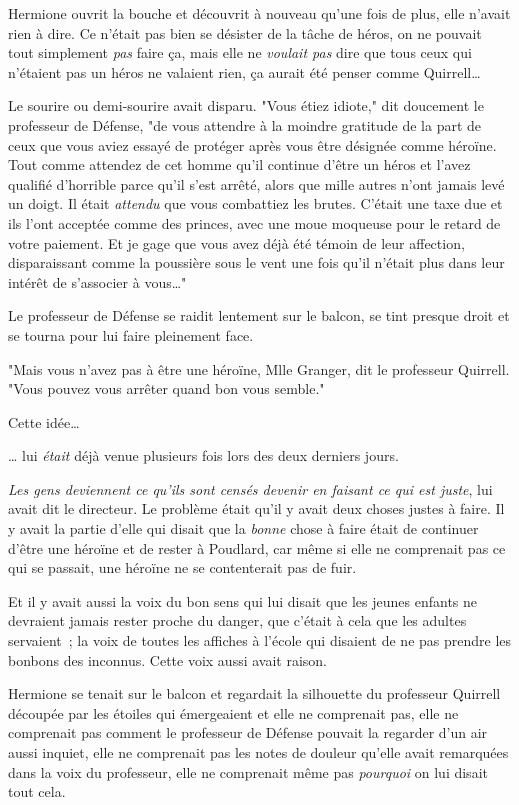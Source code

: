 Hermione ouvrit la bouche et découvrit à nouveau qu'une fois de plus, elle n'avait rien à dire. Ce n'était pas bien se désister de la tâche de héros, on ne pouvait tout simplement \emph{pas} faire ça, mais elle ne \emph{voulait pas} dire que tous ceux qui n'étaient pas un héros ne valaient rien, ça aurait été penser comme Quirrell…

Le sourire ou demi-sourire avait disparu. "Vous étiez idiote," dit doucement le professeur de Défense, "de vous attendre à la moindre gratitude de la part de ceux que vous aviez essayé de protéger après vous être désignée comme héroïne. Tout comme attendez de cet homme qu'il continue d'être un héros et l'avez qualifié d'horrible parce qu'il s'est arrêté, alors que mille autres n'ont jamais levé un doigt. Il était \emph{attendu} que vous combattiez les brutes. C'était une taxe due et ils l'ont acceptée comme des princes, avec une moue moqueuse pour le retard de votre paiement. Et je gage que vous avez déjà été témoin de leur affection, disparaissant comme la poussière sous le vent une fois qu'il n'était plus dans leur intérêt de s'associer à vous…"

Le professeur de Défense se raidit lentement sur le balcon, se tint presque droit et se tourna pour lui faire pleinement face.

"Mais vous n'avez pas à être une héroïne, Mlle Granger, dit le professeur Quirrell. "Vous pouvez vous arrêter quand bon vous semble."

Cette idée…

… lui \emph{était} déjà venue plusieurs fois lors des deux derniers jours.

\emph{Les gens deviennent ce qu'ils sont censés devenir en faisant ce qui est juste}, lui avait dit le directeur. Le problème était qu'il y avait deux choses justes à faire. Il y avait la partie d'elle qui disait que la \emph{bonne} chose à faire était de continuer d'être une héroïne et de rester à Poudlard, car même si elle ne comprenait pas ce qui se passait, une héroïne ne se contenterait pas de fuir.

Et il y avait aussi la voix du bon sens qui lui disait que les jeunes enfants ne devraient jamais rester proche du danger, que c'était à cela que les adultes servaient~; la voix de toutes les affiches à l'école qui disaient de ne pas prendre les bonbons des inconnus. Cette voix aussi avait raison.

Hermione se tenait sur le balcon et regardait la silhouette du professeur Quirrell découpée par les étoiles qui émergeaient et elle ne comprenait pas, elle ne comprenait pas comment le professeur de Défense pouvait la regarder d'un air aussi inquiet, elle ne comprenait pas les notes de douleur qu'elle avait remarquées dans la voix du professeur, elle ne comprenait même pas \emph{pourquoi} on lui disait tout cela.

